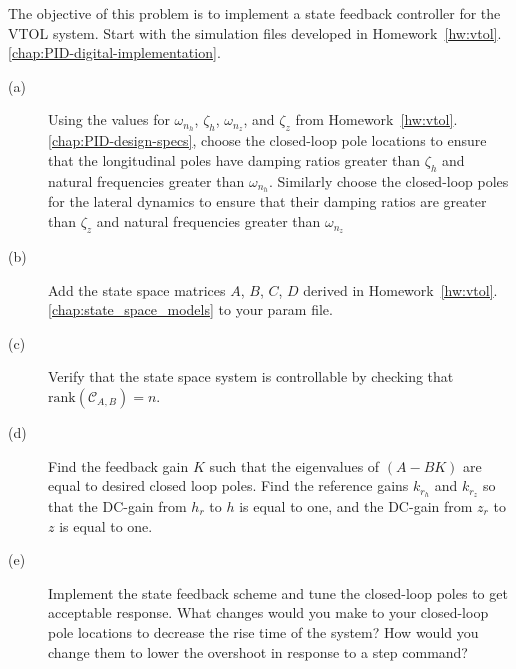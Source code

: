 The objective of this problem is to implement a state feedback controller for the VTOL system.  
Start with the simulation files developed in Homework~\ref{hw:vtol}.\ref{chap:PID-digital-implementation}.
\begin{description}
\item[(a)] Using the values for $\omega_{n_h}$, $\zeta_h$, $\omega_{n_z}$, and $\zeta_z$ from Homework~\ref{hw:vtol}.\ref{chap:PID-design-specs}, choose the closed-loop pole locations to ensure that the longitudinal poles have damping ratios greater than $\zeta_h$ and natural frequencies greater than $\omega_{n_h}$. Similarly choose the closed-loop poles for the lateral dynamics to ensure that their damping ratios are greater than $\zeta_z$ and natural frequencies greater than $\omega_{n_z}$
\item[(b)] Add the state space matrices $A$, $B$, $C$, $D$ derived in Homework~\ref{hw:vtol}.\ref{chap:state_space_models} to your param file.
\item[(c)] Verify that the state space system is controllable by checking that $\text{rank}(\mathcal{C}_{A,B})=n$.
\item[(d)] Find the feedback gain $K$ such that the eigenvalues of $(A-BK)$ are equal to desired closed loop poles.  Find the reference gains $k_{r_h}$ and $k_{r_z}$ so that the DC-gain from $h_r$ to $h$ is equal to one, and the DC-gain from $z_r$ to $z$ is equal to one.  
\item[(e)] Implement the state feedback scheme and tune the closed-loop poles to get acceptable response. What changes would you make to your closed-loop pole locations to decrease the rise time of the system? How would you change them to lower the overshoot in response to a step command?
\end{description}
